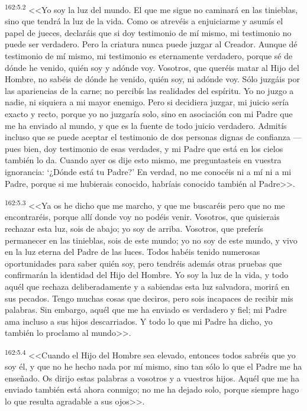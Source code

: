 \par 
\textsuperscript{162:5.2} <<Yo soy la luz del mundo. El que me sigue no caminará en las tinieblas, sino que tendrá la luz de la vida. Como os atrevéis a enjuiciarme y asumís el papel de jueces, declaráis que si doy testimonio de mí mismo, mi testimonio no puede ser verdadero. Pero la criatura nunca puede juzgar al Creador. Aunque dé testimonio de mí mismo, mi testimonio es eternamente verdadero, porque sé de dónde he venido, quién soy y adónde voy. Vosotros, que queréis matar al Hijo del Hombre, no sabéis de dónde he venido, quién soy, ni adónde voy. Sólo juzgáis por las apariencias de la carne; no percibís las realidades del espíritu. Yo no juzgo a nadie, ni siquiera a mi mayor enemigo. Pero si decidiera juzgar, mi juicio sería exacto y recto, porque yo no juzgaría solo, sino en asociación con mi Padre que me ha enviado al mundo, y que es la fuente de todo juicio verdadero. Admitís incluso que se puede aceptar el testimonio de dos personas dignas de confianza ---pues bien, doy testimonio de esas verdades, y mi Padre que está en los cielos también lo da. Cuando ayer os dije esto mismo, me preguntasteis en vuestra ignorancia: `¿Dónde está tu Padre?' En verdad, no me conocéis ni a mí ni a mi Padre, porque si me hubierais conocido, habríais conocido también al Padre>>.

\par 
\textsuperscript{162:5.3} <<Ya os he dicho que me marcho, y que me buscaréis pero que no me encontraréis, porque allí donde voy no podéis venir. Vosotros, que quisierais rechazar esta luz, sois de abajo; yo soy de arriba. Vosotros, que preferís permanecer en las tinieblas, sois de este mundo; yo no soy de este mundo, y vivo en la luz eterna del Padre de las luces. Todos habéis tenido numerosas oportunidades para saber quién soy, pero tendréis además otras pruebas que confirmarán la identidad del Hijo del Hombre. Yo soy la luz de la vida, y todo aquél que rechaza deliberadamente y a sabiendas esta luz salvadora, morirá en sus pecados. Tengo muchas cosas que deciros, pero sois incapaces de recibir mis palabras. Sin embargo, aquél que me ha enviado es verdadero y fiel; mi Padre ama incluso a sus hijos descarriados. Y todo lo que mi Padre ha dicho, yo también lo proclamo al mundo>>.

\par 
\textsuperscript{162:5.4} <<Cuando el Hijo del Hombre sea elevado, entonces todos sabréis que yo soy él, y que no he hecho nada por mí mismo, sino tan sólo lo que el Padre me ha enseñado. Os dirijo estas palabras a vosotros y a vuestros hijos. Aquél que me ha enviado también está ahora conmigo; no me ha dejado solo, porque siempre hago lo que resulta agradable a sus ojos>>.

